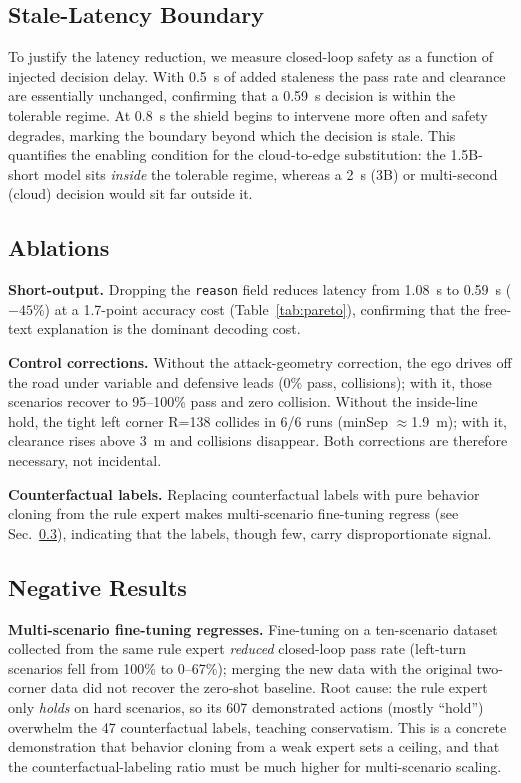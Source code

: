\documentclass[conference]{IEEEtran}
\begin{document}
\subsection{Stale-Latency Boundary}
\label{sec:stale}
To justify the latency reduction, we measure closed-loop safety as a function of
injected decision delay. With 0.5~s of added staleness the pass rate and
clearance are essentially unchanged, confirming that a 0.59~s decision is within
the tolerable regime. At 0.8~s the shield begins to intervene more often and
safety degrades, marking the boundary beyond which the decision is stale. This
quantifies the enabling condition for the cloud-to-edge substitution: the
1.5B-short model sits \emph{inside} the tolerable regime, whereas a 2~s (3B) or
multi-second (cloud) decision would sit far outside it.

\subsection{Ablations}
\textbf{Short-output.} Dropping the \texttt{reason} field reduces latency from
1.08~s to 0.59~s ($-45\%$) at a 1.7-point accuracy cost (Table~\ref{tab:pareto}),
confirming that the free-text explanation is the dominant decoding cost.

\textbf{Control corrections.} Without the attack-geometry correction, the ego
drives off the road under variable and defensive leads (0\% pass, collisions);
with it, those scenarios recover to 95--100\% pass and zero collision. Without
the inside-line hold, the tight left corner R=138 collides in 6/6 runs
(minSep $\approx$1.9~m); with it, clearance rises above 3~m and collisions
disappear. Both corrections are therefore necessary, not incidental.

\textbf{Counterfactual labels.} Replacing counterfactual labels with pure
behavior cloning from the rule expert makes multi-scenario fine-tuning regress
(see Sec.~\ref{sec:neg}), indicating that the labels, though few, carry
disproportionate signal.

\subsection{Negative Results}
\label{sec:neg}
\textbf{Multi-scenario fine-tuning regresses.} Fine-tuning on a ten-scenario
dataset collected from the same rule expert \emph{reduced} closed-loop pass rate
(left-turn scenarios fell from 100\% to 0--67\%); merging the new data with the
original two-corner data did not recover the zero-shot baseline. Root cause:
the rule expert only \emph{holds} on hard scenarios, so its 607 demonstrated
actions (mostly ``hold'') overwhelm the 47 counterfactual labels, teaching
conservatism. This is a concrete demonstration that behavior cloning from a
weak expert sets a ceiling, and that the counterfactual-labeling ratio must be
much higher for multi-scenario scaling.
\end{document}
